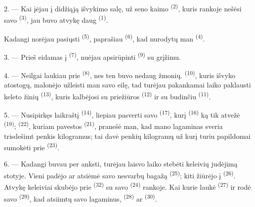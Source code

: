 2. --- Kai įėjau į didžiąją išvykimo salę, už seno kaimo 
\textsuperscript{(2)}, kuris rankoje nešėsi savo 
\textsuperscript{(3)}, jau buvo atvykę daug  \textsuperscript{(1)}.

Kadangi norėjau pasiųsti  \textsuperscript{(5)}, paprašiau
 \textsuperscript{(6)}, kad nurodytų man  \textsuperscript{(4)}.

3. --- Prieš eidamas į  \textsuperscript{(7)}, nuėjau apsirūpinti
 \textsuperscript{(9)} su grįžimu.

4. --- Neilgai laukiau prie  \textsuperscript{(8)}, nes ten buvo
nedaug žmonių.  \textsuperscript{(10)}, kuris išvyko atostogų,
malonėjo užleisti man savo eilę, tad turėjau pakankamai laiko paklausti keleto žinių
 \textsuperscript{(13)}, kuris kalbėjosi su priežiūros
 \textsuperscript{(12)} ir su budinčiu 
\textsuperscript{(11)}.

\VUsaut{3.0mm}

5. --- Nusipirkęs laikraštį  \textsuperscript{(14)}, liepiau
pasverti savo  \textsuperscript{(17)}, kurį 
\textsuperscript{(16)} ką tik atvežė  \textsuperscript{(19)};
 \textsuperscript{(22)}, kuriam pavestos 
\textsuperscript{(21)}, pranešė man, kad mano lagaminas sveria trisdešimt penkis
kilogramus; tai davė penkių kilogramų  už kurį turiu papildomai
sumokėti prie  \textsuperscript{(23)}.

6. --- Kadangi buvau per anksti, turėjau laisvo laiko stebėti keleivių judėjimą
stotyje. Vieni padėjo ar atsiėmė savo nesvarbų bagažą 
\textsuperscript{(25)}; kiti žiūrėjo į  \textsuperscript{(26)}.
Atvykę keleiviai skubėjo prie  \textsuperscript{(32)} su savo
 \textsuperscript{(24)} rankoje. Kai kurie laukė  \textsuperscript{(27)} ir rodė savo 
\textsuperscript{(29)}, kad atsiimtų savo lagaminus, 
\textsuperscript{(28)} ar  \textsuperscript{(30)}.

